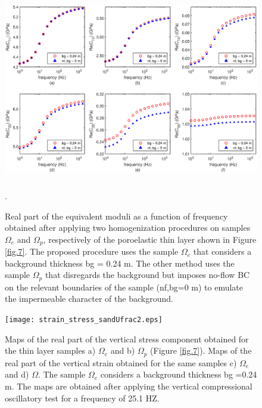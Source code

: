 \documentclass[draft]{agujournal2019}
\begin{document}
\begin{figure}[!ht]
\centering
        \includegraphics[width= 120mm, height=80mm]{cij_2sandshaleUfrac2.eps}
\caption{Real part of the equivalent moduli as a function of frequency obtained after applying two homogenization procedures on samples $\Omega_e$ and  $\Omega_p$, respectively of the poroelastic thin layer shown in Figure \ref{fig.7}. The proposed procedure uses the sample $\Omega_e$ that considers a background thickness bg = 0.24 m. The other method uses the sample $\Omega_p$ that disregards the background but imposes no-flow BC on the relevant boundaries of the sample (nf,bg=0 m) to emulate the impermeable character of the background.}. 

\label{fig.8}
\end{figure}

\begin{figure}[!ht]
\centering
        \texttt{[image: strain\_stress\_sandUfrac2.eps]}
\caption{Maps of the real part of the vertical stress component obtained for the thin layer samples a) $\Omega_e$  and b) $\Omega_p$ (Figure \ref{fig.7}). Maps of the real part of the vertical strain  obtained for the same samples c) $\Omega_e$  and d) $\Omega$. 
The sample $\Omega_e$ considers a background thickness bg =0.24 m.
The maps are obtained after applying the vertical compressional oscillatory test for a frequency of 25.1 HZ.}
\label{fig.9}
\end{figure}
\end{document}
